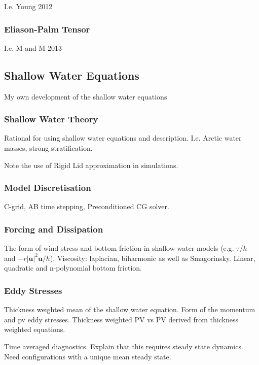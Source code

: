 \documentclass[10pt,a4paper]{article}
\begin{document}
I.e. Young 2012

\subsubsection{Eliason-Palm Tensor}

I.e. M and M 2013

\subsection{Shallow Water Equations}

My own development of the shallow water equations

\subsubsection{Shallow Water Theory}

Rational for using shallow water equations and
description. I.e. Arctic water masses, 
strong stratification.

Note the use of Rigid Lid approximation in
simulations.

\subsubsection{Model Discretisation}

C-grid, AB time stepping, Preconditioned CG solver. 

\subsubsection{Forcing and Dissipation}

The form of wind stress and bottom friction in
shallow water models (e.g. $\tau/h$ and 
$-r\left|\boldsymbol{u}\right|^{2}\boldsymbol{u}/h$). Viscosity:
laplacian, biharmonic as well as Smagorinsky.
Linear, quadratic and n-polynomial bottom friction.

\subsubsection{Eddy Stresses}

Thickness weighted mean of the shallow water
equation. Form of the momentum and pv eddy stresses.
Thickness weighted PV vs PV derived from thickness weighted equations.

Time averaged diagnostics. Explain that this requires steady state dynamics. Need configurations
with a unique mean steady state.
\end{document}

